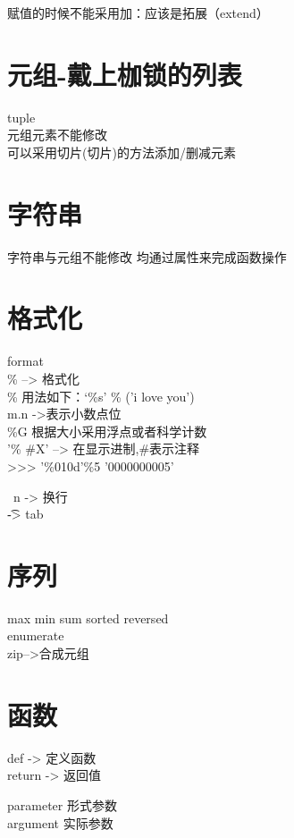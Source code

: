 \documentclass[a4paper,10pt]{ctexart}
\begin{document}
赋值的时候不能采用加：应该是拓展（extend）

\section{元组-戴上枷锁的列表}
tuple
\\ 元组元素不能修改
\\ 可以采用切片(切片)的方法添加/删减元素

\section{字符串}

字符串与元组不能修改
均通过属性来完成函数操作


\section{格式化}

format\\
\% --> 格式化 \\
\% 用法如下：‘\%s’ \% ('i love you')\\
m.n ->表示小数点位\\
\%G 根据大小采用浮点或者科学计数\\
'\% \#X' --> 在显示进制,\#表示注释\\
>>> '\%010d'\%5
'0000000005'

\ n  -> 换行
\\\t-> tab
\section{序列}

max min sum sorted reversed
\\ enumerate
\\ zip-->合成元组

\section{函数}


def -> 定义函数
\\return -> 返回值

parameter  形式参数
\\argument   实际参数
\end{document}
